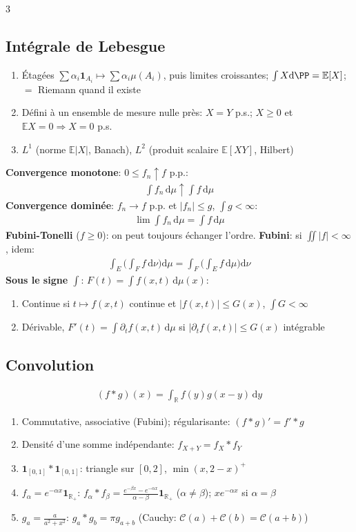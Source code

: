 \documentclass[12pt, a4paper]{article}
\newcommand{\dd}{\mathrm{d}}
\newcommand{\E}{\mathbb{E}}
\newcommand{\R}{\mathbb{R}}
\newcommand{\ind}{\mathbf{1}}
\begin{document}
\begin{multicols*}{3}
	\subsection{Intégrale de Lebesgue}
	\begin{enumerate}[\roman*.]
		\item Étagées $\sum\alpha_i\ind_{A_i}\mapsto\sum\alpha_i\mu(A_i)$, puis limites croissantes; $\int X\dd\PP=\E[X]$; $=$ Riemann quand il existe
		\item Défini à un ensemble de mesure nulle près: $X=Y$ p.s.; $X\geq0$ et $\E X=0\Rightarrow X=0$ p.s.
		\item $L^1$ (norme $\E|X|$, Banach), $L^2$ (produit scalaire $\E[XY]$, Hilbert)
	\end{enumerate}

	\textbf{Convergence monotone}: $0\leq f_n\uparrow f$ p.p.:
	\begin{gather*}
		\int f_n\,\dd\mu\uparrow\int f\,\dd\mu
	\end{gather*}
	\textbf{Convergence dominée}: $f_n\to f$ p.p. et $|f_n|\leq g$, $\int g<\infty$:
	\begin{gather*}
		\lim\int f_n\,\dd\mu=\int f\,\dd\mu
	\end{gather*}
	\textbf{Fubini-Tonelli} ($f\geq0$): on peut toujours échanger l'ordre. \textbf{Fubini}: si $\iint|f|<\infty$, idem:
	\begin{gather*}
		\int_E\!\Big(\int_Ff\,\dd\nu\Big)\dd\mu=\int_F\!\Big(\int_Ef\,\dd\mu\Big)\dd\nu
	\end{gather*}
	\textbf{Sous le signe $\int$}: $F(t)=\int f(x,t)\,\dd\mu(x)$:
	\begin{enumerate}[\roman*.]
		\item Continue si $t\mapsto f(x,t)$ continue et $|f(x,t)|\leq G(x)$, $\int G<\infty$
		\item Dérivable, $F'(t)=\int\partial_tf(x,t)\,\dd\mu$ si $|\partial_tf(x,t)|\leq G(x)$ intégrable
	\end{enumerate}
	\subsection{Convolution}
	\begin{gather*}
		(f*g)(x)=\int_\R f(y)g(x-y)\,\dd y
	\end{gather*}
	\begin{enumerate}[\roman*.]
		\item Commutative, associative (Fubini); régularisante: $(f*g)'=f'*g$
		\item Densité d'une somme indépendante: $f_{X+Y}=f_X*f_Y$
		\item $\ind_{[0,1]}*\ind_{[0,1]}$: triangle sur $[0,2]$, $\min(x,2-x)^+$
		\item $f_\alpha=e^{-\alpha x}\ind_{\R_+}$: $f_\alpha*f_\beta=\frac{e^{-\beta x}-e^{-\alpha x}}{\alpha-\beta}\ind_{\R_+}$ ($\alpha\neq\beta$); $xe^{-\alpha x}$ si $\alpha=\beta$
		\item $g_a=\frac a{a^2+x^2}$: $g_a*g_b=\pi g_{a+b}$ (Cauchy: $\mathcal C(a)+\mathcal C(b)=\mathcal C(a+b)$)
	\end{enumerate}



\end{multicols*}
\end{document}
